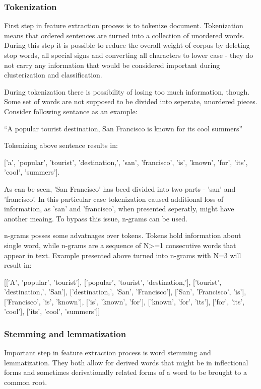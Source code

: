 \subsubsection{Tokenization}
First step in feature extraction process is to tokenize document. Tokenization means that ordered sentences are turned into a collection of unordered words. During this step it is possible to reduce the overall weight of corpus by deleting stop words, all special signs and converting all characters to lower case - they do not carry any information that would be considered important during clusterization and classification.

During tokenization there is possibility of losing too much information, though. Some set of words are not supposed to be divided into seperate, unordered pieces. Consider following sentance as an example:

\textquotedblleft A popular tourist destination, San Francisco is known for its cool summers\textquotedblright

Tokenizing above sentence results in:

['a', 'popular', 'tourist', 'destination,', 'san', 'francisco', 'is', 'known', 'for', 'its', 'cool', 'summers'].

As can be seen, 'San Francisco' has beed divided into two parts - 'san' and 'francisco'. In this particular case tokenization caused additional loss of information, as 'san' and 'francisco', when presented seperatly, might have another meaing. To bypass this issue, n-grams can be used.

n-grams posses some advatnages over tokens. Tokens hold information about single word, while n-grams are a sequence of N>=1 consecutive words that appear in text. Example presented above turned into n-grams with N=3 will result in:

[['A', 'popular', 'tourist'], ['popular', 'tourist', 'destination,'], ['tourist', 'destination,', 'San'], ['destination,', 'San', 'Francisco'], ['San', 'Francisco', 'is'], ['Francisco', 'is', 'known'], ['is', 'known', 'for'], ['known', 'for', 'its'], ['for', 'its', 'cool'], ['its', 'cool', 'summers']]

\subsubsection{Stemming and lemmatization}
Important step in feature extraction process is word stemming and lemmatization. They both allow for derived words that might be in inflectional forms and sometimes derivationally related forms of a word to be brought to a common root. 

